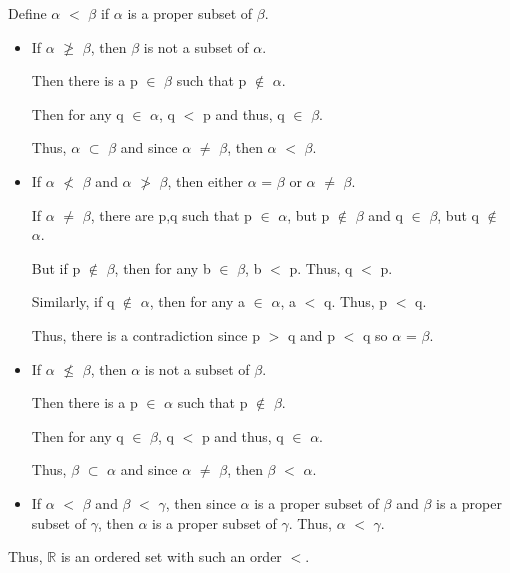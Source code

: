 	\begin{adjustbox}{minipage=14cm, right, vspace=0.1cm 0cm}
		Define $\alpha$ $<$ $\beta$ if $\alpha$ is a proper subset of $\beta$.

		\begin{itemize}[leftmargin=1cm, itemsep=0.4em]
			\item If $\alpha$ $\not \geq$ $\beta$, then $\beta$ is not a subset of $\alpha$.

				Then there is a p $\in$ $\beta$ such that p $\not \in$ $\alpha$.

				Then for any q $\in$ $\alpha$, q $<$ p and thus, q $\in$ $\beta$.

				Thus, $\alpha$ $\subset$ $\beta$ and since $\alpha$ $\neq$ $\beta$,
				then $\alpha$ $<$ $\beta$.

			\item If $\alpha$ $\not <$ $\beta$ and $\alpha$ $\not >$ $\beta$,
				then either $\alpha$ = $\beta$ or $\alpha$ $\neq$ $\beta$.

				If $\alpha$ $\neq$ $\beta$, there are p,q such that
				p $\in$ $\alpha$, but p $\not \in$ $\beta$ and q $\in$ $\beta$,
				but q $\not \in$ $\alpha$.

				But if p $\not \in$ $\beta$, then for any b $\in$ $\beta$, b $<$ p.
				Thus, q $<$ p.

				Similarly, if q $\not \in$ $\alpha$, then for any a $\in$ $\alpha$,
				a $<$ q. Thus, p $<$ q.

				Thus, there is a contradiction since p $>$ q and p $<$ q so
				$\alpha$ = $\beta$.

			\item If $\alpha$ $\not \leq$ $\beta$, then $\alpha$ is not a subset of $\beta$.

				Then there is a p $\in$ $\alpha$ such that p $\not \in$ $\beta$.

				Then for any q $\in$ $\beta$, q $<$ p and thus, q $\in$ $\alpha$.

				Thus, $\beta$ $\subset$ $\alpha$ and since $\alpha$ $\neq$ $\beta$,
				then $\beta$ $<$ $\alpha$.

			\item If $\alpha$ $<$ $\beta$ and $\beta$ $<$ $\gamma$, then since
				$\alpha$ is a proper subset of $\beta$ and $\beta$ is a proper subset
				of $\gamma$, then $\alpha$ is a proper subset of $\gamma$.
				Thus, $\alpha$ $<$ $\gamma$.
		\end{itemize}

		Thus, $\mathbb{R}$ is an ordered set with such an order $<$. \\
	\end{adjustbox}

